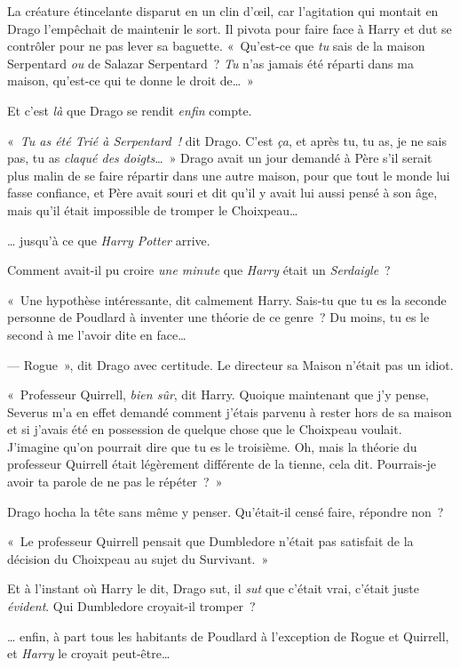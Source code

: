 La créature étincelante disparut en un clin d'œil, car l'agitation qui montait en Drago l'empêchait de maintenir le sort.
Il pivota pour faire face à Harry et dut se contrôler pour ne pas lever sa baguette.
«~Qu'est-ce que \emph{tu} sais de la maison Serpentard \emph{ou} de Salazar Serpentard~?
\emph{Tu} n'as jamais été réparti dans ma maison, qu'est-ce qui te donne le droit de…~»

Et c'est \emph{là} que Drago se rendit \emph{enfin} compte.

«~\emph{Tu as été Trié à Serpentard~!
} dit Drago.
C'est \emph{ça}, et après tu, tu as, je ne sais pas, tu as \emph{claqué des doigts}…~»
Drago avait un jour demandé à Père s'il serait plus malin de se faire répartir dans une autre maison, pour que tout le monde lui fasse confiance, et Père avait souri et dit qu'il y avait lui aussi pensé à son âge, mais qu'il était impossible de tromper le Choixpeau…

… jusqu'à ce que \emph{Harry Potter} arrive.

Comment avait-il pu croire \emph{une minute} que \emph{Harry} était un \emph{Serdaigle}~?

«~Une hypothèse intéressante, dit calmement Harry.
Sais-tu que tu es la seconde personne de Poudlard à inventer une théorie de ce genre~?
Du moins, tu es le second à me l'avoir dite en face…

--- Rogue~», dit Drago avec certitude.
Le directeur sa Maison n'était pas un idiot.

«~Professeur Quirrell, \emph{bien sûr}, dit Harry.
Quoique maintenant que j'y pense, Severus m'a en effet demandé comment j'étais parvenu à rester hors de sa maison et si j'avais été en possession de quelque chose que le Choixpeau voulait.
J'imagine qu'on pourrait dire que tu es le troisième.
Oh, mais la théorie du professeur Quirrell était légèrement différente de la tienne, cela dit.
Pourrais-je avoir ta parole de ne pas le répéter~?~»

Drago hocha la tête sans même y penser.
Qu'était-il censé faire, répondre non~?

«~Le professeur Quirrell pensait que Dumbledore n'était pas satisfait de la décision du Choixpeau au sujet du Survivant.~»

Et à l'instant où Harry le dit, Drago sut, il \emph{sut} que c'était vrai, c'était juste \emph{évident}.
Qui Dumbledore croyait-il tromper~?

… enfin, à part tous les habitants de Poudlard à l'exception de Rogue et Quirrell, et \emph{Harry} le croyait peut-être…

